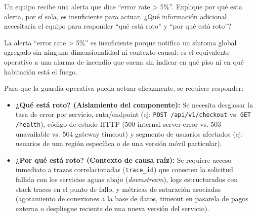 \documentclass[variant=guia,cover=institutional,mode=screen]{ua-engineering-v6-article}
\begin{document}
\begin{uaexercise}
Un equipo recibe una alerta que dice ``error rate > 5\%''. Explique por qué esta alerta, por sí sola, es insuficiente para actuar. ¿Qué información adicional necesitaría el equipo para responder ``qué está roto'' y ``por qué está roto''?
\end{uaexercise}
\begin{uaanswer}
La alerta ``error rate > 5\%'' es insuficiente porque notifica un síntoma global agregado sin ninguna dimensionalidad ni contexto causal: es el equivalente operativo a una alarma de incendio que suena sin indicar en qué piso ni en qué habitación está el fuego.

Para que la guardia operativa pueda actuar eficazmente, se requiere responder:
\begin{itemize}
\item \textbf{¿Qué está roto? (Aislamiento del componente):} Se necesita desglosar la tasa de error por servicio, ruta/endpoint (ej: \texttt{POST /api/v1/checkout} vs. \texttt{GET /health}), código de estado HTTP (500 internal server error vs. 503 unavailable vs. 504 gateway timeout) y segmento de usuarios afectados (ej: usuarios de una región específica o de una versión móvil particular).
\item \textbf{¿Por qué está roto? (Contexto de causa raíz):} Se requiere acceso inmediato a trazas correlacionadas (\texttt{trace\_id}) que conecten la solicitud fallida con los servicios aguas abajo (\emph{downstream}), logs estructurados con stack traces en el punto de fallo, y métricas de saturación asociadas (agotamiento de conexiones a la base de datos, timeout en pasarela de pagos externa o despliegue reciente de una nueva versión del servicio).
\end{itemize}
\end{uaanswer}
\end{document}
